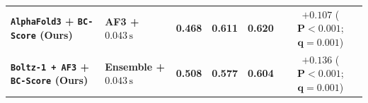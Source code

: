 \documentclass[10pt,twocolumn]{article}
\begin{document}
\begin{table}[p]
{\begin{tabular}{@{}llcccc@{}}
\hspace{0.5em}\textbf{\texttt{AlphaFold3} + \texttt{BC-Score} (Ours)} & \textbf{AF3 + $0.043\,\text{s}$} & \textbf{0.468} & \textbf{0.611} & \textbf{0.620} & $\mathbf{+0.107}$ ($\mathbf{P < 0.001}$; $\mathbf{q = 0.001}$) \\
\hspace{0.5em}\textbf{\texttt{Boltz-1 + AF3} + \texttt{BC-Score} (Ours)} & \textbf{Ensemble + $0.043\,\text{s}$} & \textbf{0.508} & \textbf{0.577} & \textbf{0.604} & $\mathbf{+0.136}$ ($\mathbf{P < 0.001}$; $\mathbf{q = 0.001}$) \\
\bottomrule
\end{tabular}%
}
\end{table}

\clearpage
\captionsetup[figure]{name=Extended Data Figure}
\captionsetup[table]{name=Extended Data Table}
\setcounter{figure}{0}
\setcounter{table}{0}
\renewcommand{\theHfigure}{focused.\arabic{figure}}
\renewcommand{\theHtable}{exttab.\arabic{table}}
\end{document}
